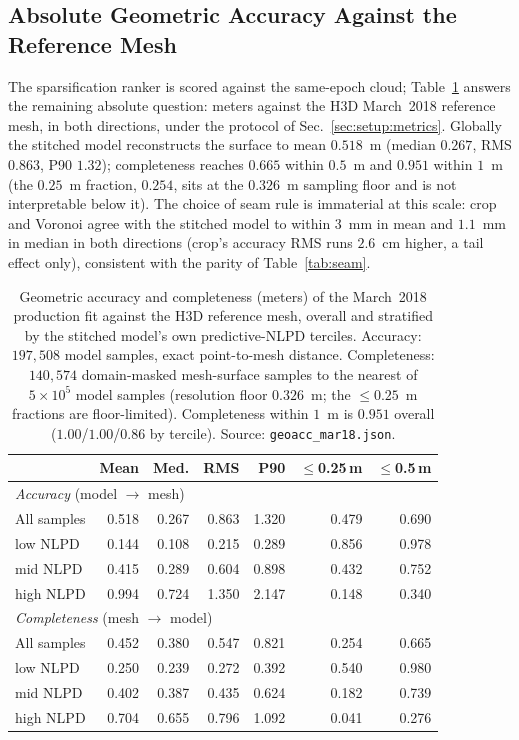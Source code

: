 \subsection{Absolute Geometric Accuracy Against the Reference Mesh}
\label{sec:results:geoacc}

 The sparsification ranker is scored against the same-epoch cloud;
Table~\ref{tab:geoacc} answers the remaining absolute question:
meters against the H3D March~2018 reference mesh, in both directions,
under the protocol of Sec.~\ref{sec:setup:metrics}. Globally the
stitched model reconstructs the surface to mean $0.518$~m (median
$0.267$, RMS $0.863$, P90 $1.32$); completeness reaches $0.665$
within $0.5$~m and $0.951$ within $1$~m (the $0.25$~m fraction,
$0.254$, sits at the $0.326$~m sampling floor and is not
interpretable below it). The choice of seam rule is immaterial at this
scale: crop and Voronoi agree with the stitched model to within
$3$~mm in mean and $1.1$~mm in median in both directions (crop's
accuracy RMS runs $2.6$~cm higher, a tail effect only), consistent
with the parity of Table~\ref{tab:seam}.

\begin{table}[!t]
\caption{Geometric accuracy and completeness (meters) of the
March~2018 production fit against the H3D reference mesh, overall and
stratified by the stitched model's own predictive-NLPD terciles.
Accuracy: $197{,}508$ model samples, exact point-to-mesh distance.
Completeness: $140{,}574$ domain-masked mesh-surface samples to the
nearest of $5\times10^{5}$ model samples (resolution floor
$0.326$~m; the $\le0.25$~m fractions are floor-limited).
Completeness within $1$~m is $0.951$ overall
($1.00$/$1.00$/$0.86$ by tercile). Source:
\texttt{geoacc\_mar18.json}.}
\label{tab:geoacc}
\centering
\setlength{\tabcolsep}{4.5pt}
\begin{tabular}{lrrrrrr}
\hline
 & Mean & Med. & RMS & P90 & $\le$0.25\,m & $\le$0.5\,m \\
\hline
\multicolumn{7}{l}{\emph{Accuracy} (model $\to$ mesh)} \\
All samples & 0.518 & 0.267 & 0.863 & 1.320 & 0.479 & 0.690 \\
\enskip low NLPD  & 0.144 & 0.108 & 0.215 & 0.289 & 0.856 & 0.978 \\
\enskip mid NLPD  & 0.415 & 0.289 & 0.604 & 0.898 & 0.432 & 0.752 \\
\enskip high NLPD & 0.994 & 0.724 & 1.350 & 2.147 & 0.148 & 0.340 \\
\hline
\multicolumn{7}{l}{\emph{Completeness} (mesh $\to$ model)} \\
All samples & 0.452 & 0.380 & 0.547 & 0.821 & 0.254 & 0.665 \\
\enskip low NLPD  & 0.250 & 0.239 & 0.272 & 0.392 & 0.540 & 0.980 \\
\enskip mid NLPD  & 0.402 & 0.387 & 0.435 & 0.624 & 0.182 & 0.739 \\
\enskip high NLPD & 0.704 & 0.655 & 0.796 & 1.092 & 0.041 & 0.276 \\
\hline
\end{tabular}
\end{table}

